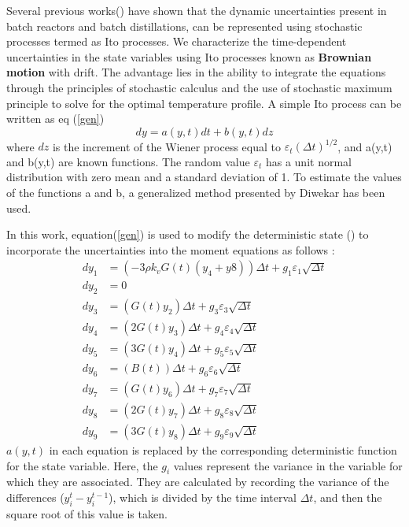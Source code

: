 \documentclass[3p,times,authoryear]{elsarticle}
\begin{document}
Several previous works(\cite{diwekar}) have shown that the dynamic uncertainties present in batch reactors\cite{benavides} and batch distillations\cite{diwekar}, can be represented using stochastic processes termed as Ito processes. We characterize the time-dependent uncertainties in the state variables using Ito processes known as \textbf{Brownian motion} with drift\cite{diwekar,wong}. The advantage lies in the ability to integrate the equations through the principles of stochastic calculus and the use of stochastic maximum principle to solve for the optimal temperature profile. 
A simple Ito process can be written as eq (\ref{gen})
\begin{equation} \label{gen}
dy = a(y,t)dt + b(y,t)dz
\end{equation}
where $dz$ is the increment of the Wiener process equal to $\varepsilon_{t}(\Delta t)^{1/2}$, and a(y,t) and b(y,t) are known functions. The random value $\varepsilon_{t}$ has a unit normal distribution with zero mean and a standard deviation of 1. To estimate the values of the functions a and b, a generalized method presented by Diwekar\cite{diwekar} has been used.\par
In this work, equation(\ref{gen}) is used to modify the deterministic state () to incorporate the uncertainties into the moment equations as follows :
\begin{align}
dy_{1} &= \left(-3\rho k_{v}G(t)(y_{4}+y{8})\right)\Delta t + g_{1}\varepsilon_{1}\sqrt{\Delta t} \label{steq1}\\
dy_{2} &= 0 \\
dy_{3} &= (G(t)y_{2})\Delta t +g_{3}\varepsilon_{3}\sqrt{\Delta t} \\
dy_{4} &= (2G(t)y_{3})\Delta t + g_{4}\varepsilon_{4}\sqrt{\Delta t} \\
dy_{5} &= (3G(t)y_{4})\Delta t + g_{5}\varepsilon_{5}\sqrt{\Delta t} \\
dy_{6} &= (B(t))\Delta t + g_{6}\varepsilon_{6}\sqrt{\Delta t} \\
dy_{7} &= (G(t)y_{6})\Delta t + g_{7}\varepsilon_{7}\sqrt{\Delta t} \\
dy_{8} &= (2G(t)y_{7})\Delta t +g_{8}\varepsilon_{8}\sqrt{\Delta t} \\
dy_{9} &= (3G(t)y_{8})\Delta t + g_{9}\varepsilon_{9}\sqrt{\Delta t} \label{steq2} 
\end{align}
$a(y,t)$ in each equation is replaced by the corresponding deterministic function for the state variable. Here, the $g_{i}$ values represent the variance in the variable for which they are associated. They are calculated by recording the variance of the differences ($y_{i}^{t} - y_{i}^{t-1}$), which is divided by the time interval $\Delta t$, and then the square root of this value is taken. \par
\end{document}
